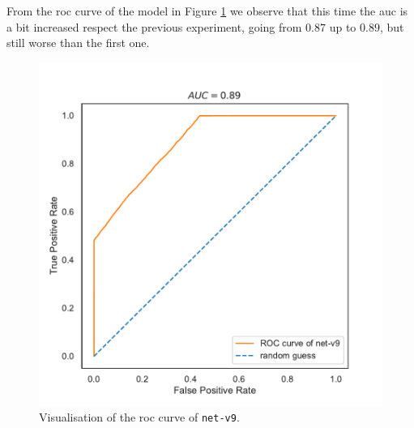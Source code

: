 \bigskip
\bigskip
From the \gls{roc} curve of the model in Figure \ref{fig:net-v9auc}  we observe 
that this time the \gls{auc} is a bit increased respect the previous experiment, 
going from $0.87$ up to $0.89$, but still worse than the first one.
\begin{figure}[!htb]
	\centering
	\includegraphics[width=.45\textwidth]{contents/images/net-v9/roc-net-v9(a)}%
	\caption[Evaluation of the \gls{roc} of \texttt{net-v9}.]{Visualisation of the 
		\gls{roc} curve of \texttt{net-v9}.}
	\label{fig:net-v9auc}
\end{figure}

